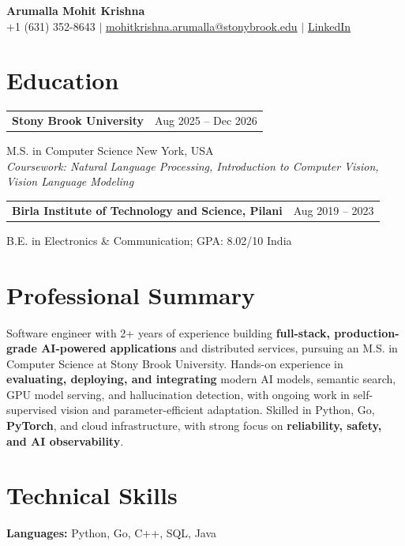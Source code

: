\documentclass[letterpaper,10pt]{article}
\makeatletter
\newcommand{\entry}[2]{%
  \noindent
  \begin{tabularx}{\linewidth}
    {@{}>{\raggedright\arraybackslash}X@{\hspace{6pt}}r@{}}
    \textbf{#1} & #2
  \end{tabularx}\par
}
\makeatother
\begin{document}
\begin{center}
    {\LARGE\bfseries Arumalla Mohit Krishna}\\[3pt]
    +1 (631) 352-8643 $|$
    \href{mailto:mohitkrishna.arumalla@stonybrook.edu}
    {mohitkrishna.arumalla@stonybrook.edu} $|$
    \href{https://linkedin.com/in/mohit-krishna-arumalla}
    {LinkedIn}
\end{center}
\vspace{-8pt}

\section{Education}

\entry
  {\textbf{Stony Brook University}}
  {Aug 2025 -- Dec 2026}

M.S. in Computer Science \hfill New York, USA\\
\textit{
Coursework: Natural Language Processing,
Introduction to Computer Vision, Vision Language Modeling
}
\vspace{3pt}

\entry
  {\textbf{Birla Institute of Technology and Science, Pilani}}
  {Aug 2019 -- 2023}

B.E. in Electronics \& Communication; GPA: 8.02/10 \hfill India
\section{Professional Summary}

Software engineer with 2+ years of experience building \textbf{full-stack, production-grade AI-powered applications} and distributed services,
pursuing an M.S. in Computer Science at Stony Brook University. Hands-on experience in \textbf{evaluating, deploying, and integrating} modern AI models,
semantic search, GPU model serving, and hallucination detection, with ongoing work in self-supervised vision and parameter-efficient adaptation.
Skilled in Python, Go, \textbf{PyTorch}, and cloud infrastructure, with strong focus on \textbf{reliability, safety, and AI observability}.

\section{Technical Skills}

\textbf{Languages:}
Python, Go, C++, SQL, Java\\
\end{document}
